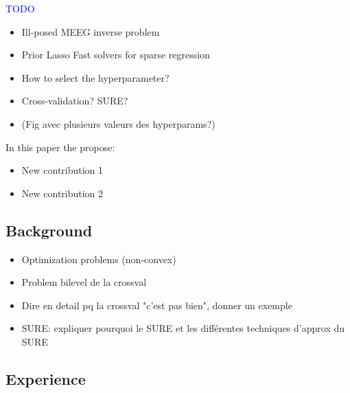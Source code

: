 \textcolor{blue}{TODO}
\begin{itemize}
    \item Ill-posed MEEG inverse problem
    \item Prior Lasso Fast solvers for sparse regression
    \item How to select the hyperparameter?
    \item Cross-validation? SURE?
    \item (Fig avec plusieurs valeurs des hyperparams?)
\end{itemize}
%
In this paper the propose:
\begin{itemize}
    \item New contribution 1
    \item New contribution 2
\end{itemize}

\subsection{Background}
\label{sub:background}
%
\begin{itemize}
    \item Optimization problems (non-convex)
    \item Problem bilevel de la crossval
    \item Dire en detail pq la crossval "c'est pas bien", donner un exemple
    \item SURE: expliquer pourquoi le SURE et les différentes techniques d'approx du SURE
\end{itemize}
%
%
%
%
\subsection{Experience}
\label{sub:experience}
%

\clearpage
